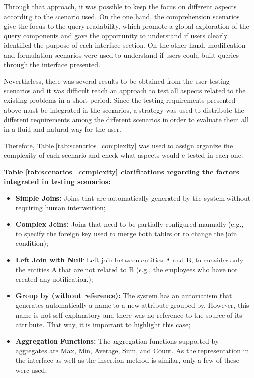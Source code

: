 Through that approach, it was possible to keep the focus on different aspects according to the scenario used. On the one hand, the comprehension scenarios give the focus to the query readability, which promote a global exploration of the query components and gave the opportunity to understand if users clearly identified the purpose of each interface section. On the other hand, modification and formulation scenarios were used to understand if users could built queries through the interface presented.

Nevertheless, there was several results to be obtained from the user testing scenarios and it was difficult reach an approach to test all aspects related to the existing problems in a short period. Since the testing requirements presented above must be integrated in the scenarios, a strategy was used to distribute the different requirements among the different scenarios in order to evaluate them all in a fluid and natural way for the user. 


Therefore, Table \ref{tab:scenarios_complexity} was used to assign organize the complexity of each scenario and check what aspects would e tested in each one.

\textbf{Table \ref{tab:scenarios_complexity} clarifications regarding the factors integrated in testing scenarios: }
\begin{itemize}
    \item \textbf{Simple Joins: }Joins that are automatically generated by the system without requiring human intervention;
    \item \textbf{Complex Joins: }Joins that need to be partially configured manually (e.g., to specify the foreign key used to merge both tables or to change the join condition);
    \item \textbf{Left Join with Null: }Left join between entities A and B, to consider only the entities A that are not related to B (e.g., the employees who have not created any notification.);
    \item \textbf{Group by (without reference): } The system has an automatism that generates automatically a name to a new attribute grouped by. However, this name is not self-explanatory and there was no reference to the source of its attribute. That way, it is important to highlight this case;
    \item \textbf{Aggregation Functions: } The aggregation functions supported by aggregates are Max, Min, Average, Sum, and Count. As the representation in the interface as well as the insertion method is similar, only a few of these were used;
\end{itemize}

